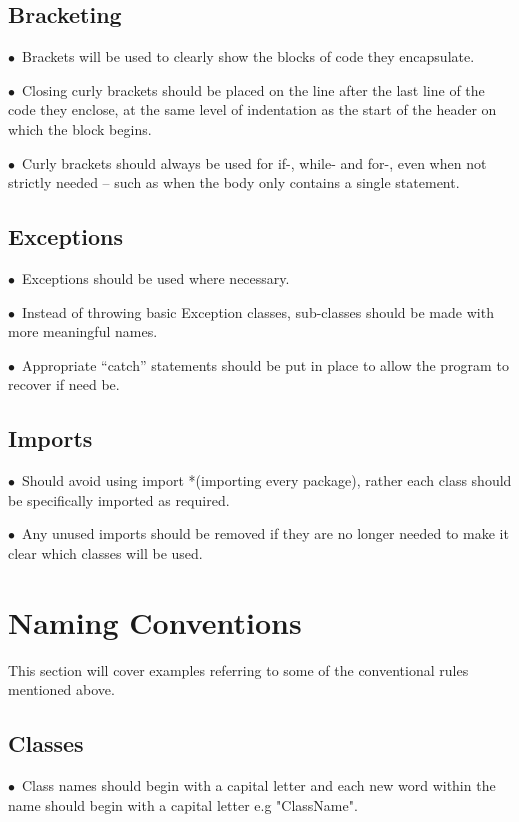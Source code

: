 \documentclass[english]{article}
\begin{document}
				\subsection{Bracketing}
$\bullet$\ Brackets will be used to clearly show the blocks of code they encapsulate.\par
$\bullet$\ Closing curly brackets should be placed on the line after the last line of the code they enclose, at the same level of indentation as the start of the header on which the block begins. \par
$\bullet$\ Curly brackets should always be used for if-, while- and for-, even when not strictly needed – such as when the body only contains a single statement.\par
\subsection{Exceptions}
$\bullet$\ Exceptions should be used where necessary.\par
$\bullet$\ Instead of throwing basic Exception classes, sub-classes should be made with more meaningful names.\par
$\bullet$\ Appropriate “catch” statements should be put in place to allow the program to recover if need be.\par



\subsection{Imports}
$\bullet$\ Should avoid using import *(importing every package), rather each class should be specifically imported as required.\par

$\bullet$\ Any unused imports should be removed if they are no longer needed to make it clear which classes will be used.\par


				
			\section{Naming Conventions	}
			This section will cover examples referring to some of the conventional rules mentioned above.
				
					\subsection{ Classes }
$\bullet$\ Class names should begin with a capital letter and each new word within the name should begin with a capital letter e.g "ClassName".\par
\end{document}
